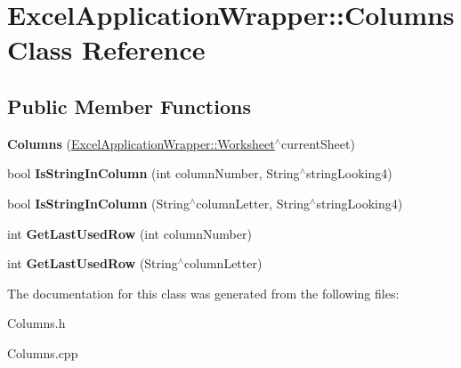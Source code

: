 \hypertarget{class_excel_application_wrapper_1_1_columns}{}\section{Excel\+Application\+Wrapper\+:\+:Columns Class Reference}
\label{class_excel_application_wrapper_1_1_columns}
\subsection*{Public Member Functions}
\begin{DoxyCompactItemize}
\item 
\hypertarget{class_excel_application_wrapper_1_1_columns_a738bef799d0f92a6f36e59bf099c8307}{}{\bfseries Columns} (\hyperlink{class_excel_application_wrapper_1_1_worksheet}{Excel\+Application\+Wrapper\+::\+Worksheet}$^\wedge$current\+Sheet)\label{class_excel_application_wrapper_1_1_columns_a738bef799d0f92a6f36e59bf099c8307}

\item 
\hypertarget{class_excel_application_wrapper_1_1_columns_a9630f46217423b71bfd784459d505e95}{}bool {\bfseries Is\+String\+In\+Column} (int column\+Number, String$^\wedge$string\+Looking4)\label{class_excel_application_wrapper_1_1_columns_a9630f46217423b71bfd784459d505e95}

\item 
\hypertarget{class_excel_application_wrapper_1_1_columns_aa43273e18a2ca6d033a9ccb0dd2fc53d}{}bool {\bfseries Is\+String\+In\+Column} (String$^\wedge$column\+Letter, String$^\wedge$string\+Looking4)\label{class_excel_application_wrapper_1_1_columns_aa43273e18a2ca6d033a9ccb0dd2fc53d}

\item 
\hypertarget{class_excel_application_wrapper_1_1_columns_a0aa22e033742ff327798534d2466b76a}{}int {\bfseries Get\+Last\+Used\+Row} (int column\+Number)\label{class_excel_application_wrapper_1_1_columns_a0aa22e033742ff327798534d2466b76a}

\item 
\hypertarget{class_excel_application_wrapper_1_1_columns_ad51e5e9b461d30f3f09a7c496cc0ea37}{}int {\bfseries Get\+Last\+Used\+Row} (String$^\wedge$column\+Letter)\label{class_excel_application_wrapper_1_1_columns_ad51e5e9b461d30f3f09a7c496cc0ea37}

\end{DoxyCompactItemize}


The documentation for this class was generated from the following files\+:\begin{DoxyCompactItemize}
\item 
Columns.\+h\item 
Columns.\+cpp\end{DoxyCompactItemize}
